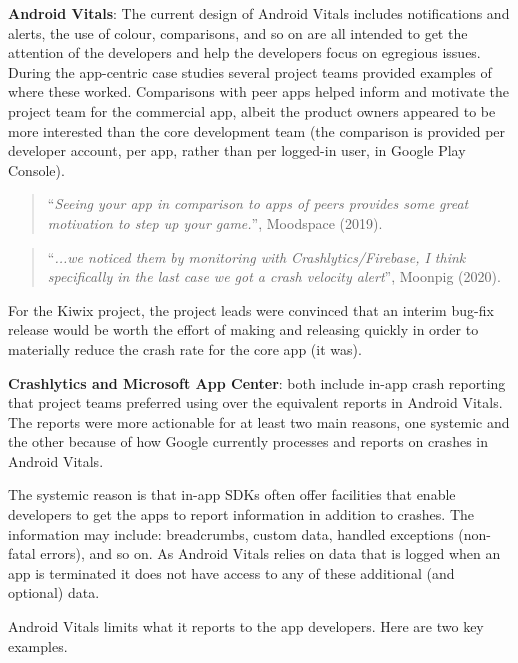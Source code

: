 \textbf{Android Vitals}: The current design of Android Vitals includes notifications and alerts, the use of colour, comparisons, and so on are all intended to get the attention of the developers and help the developers focus on egregious issues. During the app-centric case studies several project teams provided examples of where these worked. Comparisons with peer apps helped inform and motivate the project team for the commercial app, albeit the product owners appeared to be more interested than the core development team (the comparison is provided per developer account, per app, rather than per logged-in user, in Google Play Console). 

\begin{quote}
    ``\textit{Seeing your app in comparison to apps of peers provides some great motivation to step up your game.}'', Moodspace (2019).
\end{quote}

\begin{quote}
    ``\textit{...we noticed them by monitoring with Crashlytics/Firebase, I think specifically in the last case we got a crash velocity alert}'', Moonpig (2020).
\end{quote}

For the Kiwix project, the project leads were convinced that an interim bug-fix release would be worth the effort of making and releasing quickly in order to materially reduce the crash rate for the core app (it was).

\textbf{Crashlytics and Microsoft App Center}: both include in-app crash reporting that project teams preferred using over the equivalent reports in Android Vitals. The reports were more actionable for at least two main reasons, one systemic and the other because of how Google currently processes and reports on crashes in Android Vitals. 

The systemic reason is that in-app SDKs often offer facilities that enable developers to get the apps to report information in addition to crashes. The information may include: breadcrumbs, custom data, handled exceptions (non-fatal errors), and so on. As Android Vitals relies on data that is logged when an app is terminated it does not have access to any of these additional (and optional) data.

Android Vitals limits what it reports to the app developers. Here are two key examples.

